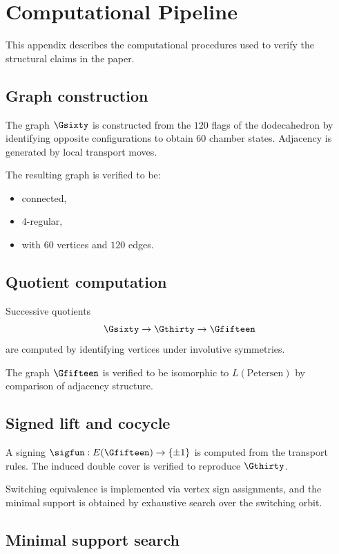 \section{Computational Pipeline}

This appendix describes the computational procedures used to verify
the structural claims in the paper.

\subsection{Graph construction}

The graph $\Gsixty$ is constructed from the $120$ flags of the
dodecahedron by identifying opposite configurations to obtain $60$
chamber states. Adjacency is generated by local transport moves.

The resulting graph is verified to be:
\begin{itemize}
\item connected,
\item $4$-regular,
\item with $60$ vertices and $120$ edges.
\end{itemize}

\subsection{Quotient computation}

Successive quotients
\[
\Gsixty \to \Gthirty \to \Gfifteen
\]
are computed by identifying vertices under involutive symmetries.

The graph $\Gfifteen$ is verified to be isomorphic to
$L(\mathrm{Petersen})$ by comparison of adjacency structure.

\subsection{Signed lift and cocycle}

A signing $\sigfun : E(\Gfifteen) \to \{\pm1\}$ is computed from the
transport rules. The induced double cover is verified to reproduce
$\Gthirty$.

Switching equivalence is implemented via vertex sign assignments, and
the minimal support is obtained by exhaustive search over the switching
orbit.

\subsection{Minimal support search}

